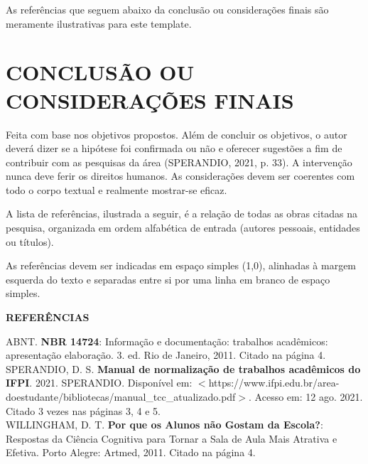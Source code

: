 \documentclass[12pt, a4paper]{article}
\begin{document}
As referências que seguem abaixo da conclusão ou considerações finais são meramente ilustrativas para este template.

\section{CONCLUSÃO OU CONSIDERAÇÕES FINAIS}

Feita com base nos objetivos propostos. Além de concluir os objetivos, o autor deverá dizer se a hipótese foi confirmada ou não e oferecer sugestões a fim de contribuir com as pesquisas da área (SPERANDIO, 2021, p. 33). A intervenção nunca deve ferir os direitos humanos. As considerações devem ser coerentes com todo o corpo textual e realmente mostrar-se eficaz.

A lista de referências, ilustrada a seguir, é a relação de todas as obras citadas na pesquisa, organizada em ordem alfabética de entrada (autores pessoais, entidades ou títulos).

As referências devem ser indicadas em espaço simples (1,0), alinhadas à margem esquerda do texto e separadas entre si por uma linha em branco de espaço simples.

\clearpage

\begin{center}
\textbf{\MakeUppercase{Referências}}
\end{center}
\vspace{1cm}

\noindent ABNT. \textbf{NBR 14724}: Informação e documentação: trabalhos acadêmicos: apresentação elaboração. 3. ed. Rio de Janeiro, 2011. Citado na página 4.\\[0.5cm]
\noindent SPERANDIO, D. S. \textbf{Manual de normalização de trabalhos acadêmicos do IFPI}. 2021. SPERANDIO. Disponível em: $<$https://www.ifpi.edu.br/area-doestudante/bibliotecas/manual\_tcc\_atualizado.pdf$>$. Acesso em: 12 ago. 2021. Citado 3 vezes nas páginas 3, 4 e 5.\\[0.5cm]
\noindent WILLINGHAM, D. T. \textbf{Por que os Alunos não Gostam da Escola?}: Respostas da Ciência Cognitiva para Tornar a Sala de Aula Mais Atrativa e Efetiva. Porto Alegre: Artmed, 2011. Citado na página 4.

\clearpage

\end{document}
